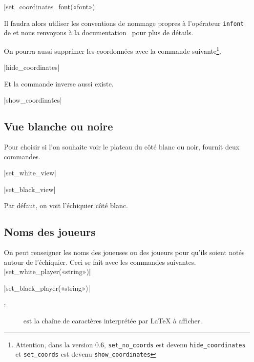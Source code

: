 \documentclass[french]{ltxdoc}
\begin{document}
\commande|set_coordinates_font(«font»)|\smallskip

Il faudra alors utiliser les conventions de nommage propres à l’opérateur
\lstinline+infont+ de \MP{} et nous renvoyons à la
documentation~\cite{ctan-metapost} pour plus de détails.

On pourra aussi supprimer les coordonnées avec la commande suivante\footnote{Attention,
dans la version 0.6, \lstinline+set_no_coords+ est devenu
\lstinline+hide_coordinates+ et \lstinline+set_coords+ est devenu
\lstinline+show_coordinates+}.

\commande|hide_coordinates|\smallskip

Et la commande inverse aussi existe.

\commande|show_coordinates|\smallskip


\subsection{Vue blanche ou noire}

Pour choisir si l’on souhaite voir le plateau du côté blanc ou noir, \mpchess fournit deux commandes.

\commande|set_white_view|\smallskip

\commande|set_black_view|\smallskip

Par défaut, on voit l’échiquier côté blanc.

\subsection{Noms des joueurs}

On peut renseigner les noms des joueuses ou des joueurs pour qu’ils soient notés
autour de l’échiquier. Ceci se fait avec les commandes suivantes.
\commande|set_white_player(«string»)|\smallskip

\commande|set_black_player(«string»)|\smallskip

\begin{description}
  \item[ :] est la chaîne de caractères interprétée par \LaTeX{} à afficher.
\end{description}
\end{document}

